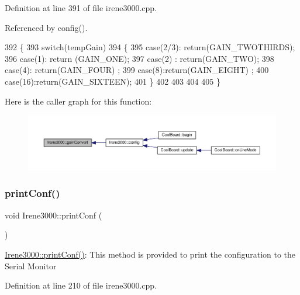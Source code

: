 Definition at line 391 of file irene3000.\+cpp.



Referenced by config().


\begin{DoxyCode}
392 \{
393     \textcolor{keywordflow}{switch}(tempGain)
394     \{
395         \textcolor{keywordflow}{case}(2/3): \textcolor{keywordflow}{return}(GAIN\_TWOTHIRDS);
396         \textcolor{keywordflow}{case}(1): \textcolor{keywordflow}{return} (GAIN\_ONE);
397         \textcolor{keywordflow}{case}(2) : \textcolor{keywordflow}{return}(GAIN\_TWO);
398         \textcolor{keywordflow}{case}(4): \textcolor{keywordflow}{return}(GAIN\_FOUR) ;   
399         \textcolor{keywordflow}{case}(8):\textcolor{keywordflow}{return}(GAIN\_EIGHT)  ;  
400         \textcolor{keywordflow}{case}(16):\textcolor{keywordflow}{return}(GAIN\_SIXTEEN);  
401     \}
402 
403 
404 
405 \}
\end{DoxyCode}
Here is the caller graph for this function\+:\nopagebreak
\begin{figure}[H]
\begin{center}
\leavevmode
\includegraphics[width=350pt]{classIrene3000_abcad62d1201a59f8dd3ba87048002728_icgraph}
\end{center}
\end{figure}
\mbox{\label{classIrene3000_a7bc2414100b5e19eacc6630fa34b2654}} 
\subsubsection{\texorpdfstring{print\+Conf()}{printConf()}}
{\footnotesize\ttfamily void Irene3000\+::print\+Conf (\begin{DoxyParamCaption}{ }\end{DoxyParamCaption})}

\hyperlink{classIrene3000_a7bc2414100b5e19eacc6630fa34b2654}{Irene3000\+::print\+Conf()}\+: This method is provided to print the configuration to the Serial Monitor 

Definition at line 210 of file irene3000.\+cpp.




